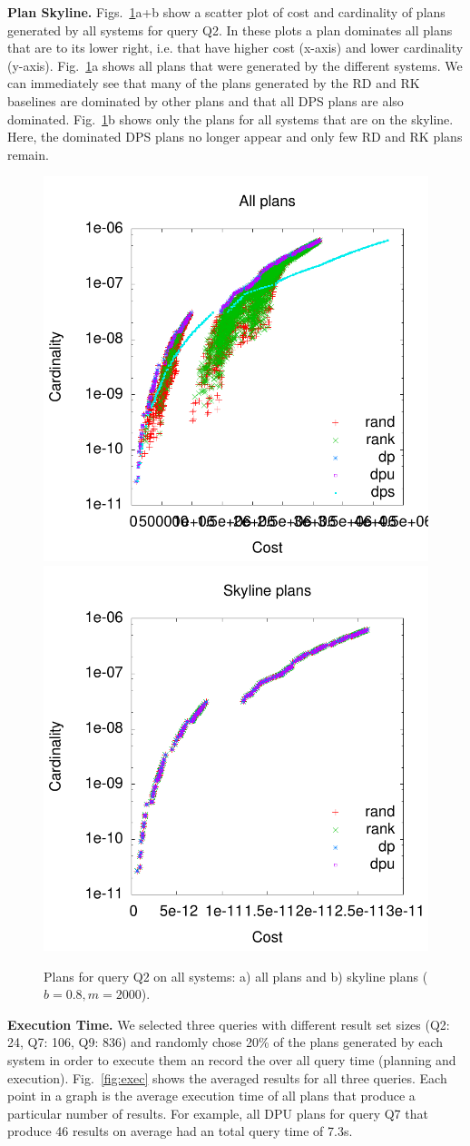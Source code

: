 \textbf{Plan Skyline.} Figs.~\ref{fig:pareto_q2_skyline}a+b show a
scatter plot of cost and cardinality of plans generated by all systems
for query Q2. In these plots a plan dominates all plans that are to
its lower right, i.e. that have higher cost (x-axis) and lower
cardinality (y-axis). Fig.~\ref{fig:pareto_q2_skyline}a shows all
plans that were generated by the different systems. We can immediately
see that many of the plans generated by the RD and RK baselines are
dominated by other plans and that all DPS plans are also
dominated. Fig.~\ref{fig:pareto_q2_skyline}b shows only the plans for
all systems that are on the skyline. Here, the dominated DPS plans no
longer appear and only few RD and RK plans remain.

\begin{figure}[htb]
  \centering
  \includegraphics[width=0.49\linewidth]{figs/plans_q2_all.pdf}
  \includegraphics[width=0.49\linewidth]{figs/plans_q2_sky.pdf}
  \caption{Plans for query Q2 on all systems: a) all plans and b)
    skyline plans ($b=0.8,m=2000$).}
  \label{fig:pareto_q2_skyline}
\end{figure}

\textbf{Execution Time.} We selected three queries with different
result set sizes (Q2: 24, Q7: 106, Q9: 836) and randomly chose 20\% of
the plans generated by each system in order to execute them an record
the over all query time (planning and execution). Fig.~\ref{fig:exec}
shows the averaged results for all three queries. Each point in a
graph is the average execution time of all plans that produce a
particular number of results. For example, all DPU plans for query Q7
that produce 46 results on average had an total query time of 7.3s.

